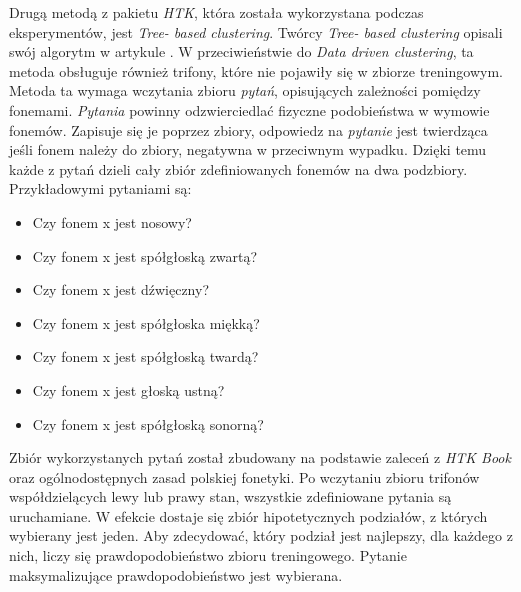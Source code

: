 \documentclass[shortabstract, mgr]{iithesis}
\begin{document}
	Drugą metodą z pakietu \textit{HTK}, która została wykorzystana podczas eksperymentów, jest \textit{Tree- based clustering}. Twórcy \textit{Tree- based clustering} opisali swój algorytm w artykule \cite{tree_based_clustring}. W przeciwieństwie do \textit{Data driven clustering}, ta metoda obsługuje również trifony, które nie pojawiły się w zbiorze treningowym. Metoda ta wymaga wczytania zbioru \textit{pytań}, opisujących zależności pomiędzy fonemami. \textit{Pytania} powinny odzwierciedlać fizyczne podobieństwa w wymowie fonemów. Zapisuje się je poprzez zbiory, odpowiedz na \textit{pytanie} jest twierdząca jeśli fonem należy do zbiory, negatywna w przeciwnym wypadku. Dzięki temu każde z pytań dzieli cały zbiór zdefiniowanych fonemów na dwa podzbiory. Przykładowymi pytaniami są:
	\begin{itemize}
		\item Czy fonem x jest nosowy?
		\item Czy fonem x jest spółgłoską zwartą?
		\item Czy fonem x jest dźwięczny?
		\item Czy fonem x jest spółgłoska miękką?
		\item Czy fonem x jest spółgłoską twardą?
		\item Czy fonem x jest głoską ustną? 
		\item Czy fonem x jest spółgłoską sonorną? 
	\end{itemize}
	 Zbiór wykorzystanych pytań został zbudowany na podstawie zaleceń z \textit{HTK Book}\cite{htkbook} oraz ogólnodostępnych zasad polskiej fonetyki. Po wczytaniu zbioru trifonów współdzielących lewy lub prawy stan, wszystkie zdefiniowane pytania są uruchamiane. W efekcie dostaje się zbiór hipotetycznych podziałów, z których wybierany jest jeden. Aby zdecydować, który podział jest najlepszy, dla każdego z nich, liczy się prawdopodobieństwo zbioru treningowego. Pytanie maksymalizujące prawdopodobieństwo jest wybierana. \\
\end{document}
